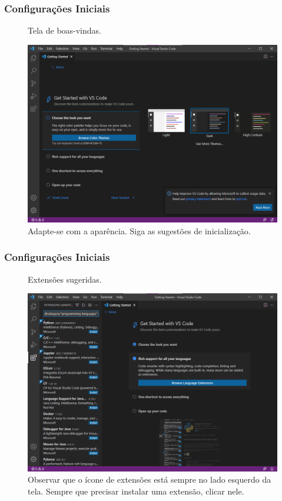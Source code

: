 \documentclass{beamer}
\begin{document}
\begin{frame}
    \frametitle{Configurações Iniciais}
\begin{figure}[h]
    \centering
    \caption{Tela de boas-vindas.}
    \label{fig:welcome_page}
    \includegraphics[width=0.8\textheight]{../images/welcome_page.png}
    \caption*{\footnotesize Adapte-se com a aparência. Siga as sugestões de inicialização.}
\end{figure}
\end{frame}

\begin{frame}
    \frametitle{Configurações Iniciais}
\begin{figure}[h]
    \centering
    \caption{Extensões sugeridas.}
    \label{fig:extensoes}
    \includegraphics[width=0.8\textheight]{../images/extensoes.png}
    \caption*{\footnotesize Observar que o ícone de extensões está sempre no lado esquerdo da tela. Sempre que precisar instalar uma extensão, clicar nele.}
\end{figure}
\end{frame}
\end{document}
